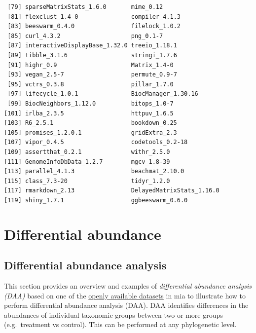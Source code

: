 \documentclass[
]{book}
\begin{document}
\begin{verbatim}
 [79] sparseMatrixStats_1.6.0       mime_0.12                    
 [81] flexclust_1.4-0               compiler_4.1.3               
 [83] beeswarm_0.4.0                filelock_1.0.2               
 [85] curl_4.3.2                    png_0.1-7                    
 [87] interactiveDisplayBase_1.32.0 treeio_1.18.1                
 [89] tibble_3.1.6                  stringi_1.7.6                
 [91] highr_0.9                     Matrix_1.4-0                 
 [93] vegan_2.5-7                   permute_0.9-7                
 [95] vctrs_0.3.8                   pillar_1.7.0                 
 [97] lifecycle_1.0.1               BiocManager_1.30.16          
 [99] BiocNeighbors_1.12.0          bitops_1.0-7                 
[101] irlba_2.3.5                   httpuv_1.6.5                 
[103] R6_2.5.1                      bookdown_0.25                
[105] promises_1.2.0.1              gridExtra_2.3                
[107] vipor_0.4.5                   codetools_0.2-18             
[109] assertthat_0.2.1              withr_2.5.0                  
[111] GenomeInfoDbData_1.2.7        mgcv_1.8-39                  
[113] parallel_4.1.3                beachmat_2.10.0              
[115] class_7.3-20                  tidyr_1.2.0                  
[117] rmarkdown_2.13                DelayedMatrixStats_1.16.0    
[119] shiny_1.7.1                   ggbeeswarm_0.6.0             
\end{verbatim}

\hypertarget{differential-abundance}{%
\chapter{Differential abundance}\label{differential-abundance}}

\hypertarget{differential-abundance-analysis}{%
\section{Differential abundance analysis}\label{differential-abundance-analysis}}

This section provides an overview and examples of \emph{differential
abundance analysis (DAA)} based on one of the \href{https://microbiome.github.io/mia/reference/mia-datasets.html}{openly available
datasets}
in mia to illustrate how to perform differential abundance analysis
(DAA). DAA identifies differences in the abundances of individual
taxonomic groups between two or more groups (e.g.~treatment vs
control). This can be performed at any phylogenetic level.
\end{document}
